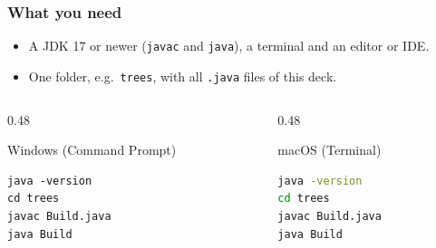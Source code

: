 \documentclass[aspectratio=169,10pt,compress]{beamer}
\begin{document}
\begin{frame}[t,fragile] \frametitle{What you need}
  \begin{itemize}
    \item A JDK 17 or newer (\texttt{javac} and \texttt{java}), a terminal and an editor or IDE.
    \item One folder, e.g.\ \texttt{trees}, with all \texttt{.java} files of this deck.
  \end{itemize}
  \begin{columns}[T]
    \begin{column}{0.48\textwidth}
      \begin{block}{Windows (Command Prompt)}


\begin{lstlisting}[style=codesnippet, language={}, basicstyle=\ttfamily\scriptsize]
java -version
cd trees
javac Build.java
java Build
\end{lstlisting}


      \end{block}
    \end{column}
    \begin{column}{0.48\textwidth}
      \begin{block}{macOS (Terminal)}


\begin{lstlisting}[style=codesnippet, language=bash, basicstyle=\ttfamily\scriptsize]
java -version
cd trees
javac Build.java
java Build
\end{lstlisting}


      \end{block}
    \end{column}
  \end{columns}

\end{frame}

\end{document}
